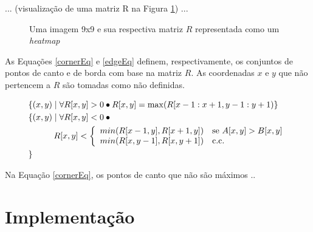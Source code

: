 \documentclass[12pt]{article}
\begin{document}
... (visualização de uma matriz R na Figura \ref{figR}) ...

\begin{figure}[h]
  \centering
  \quad
  \caption{Uma imagem 9x9 e sua respectiva matriz $R$ representada
    como um \textit{heatmap}\label{figR}}
\end{figure}


As Equações \ref{cornerEq} e \ref{edgeEq} definem, respectivamente, os
conjuntos de pontos de canto e de borda com base na matriz $R$. As
coordenadas $x$ e $y$ que não pertencem a $R$ são tomadas como não
definidas.

\begin{align}
  &\{(x, y) \mid \forall R[x,y] > 0 \bullet R[x,y] = \max(R[x-1:x+1,y-1:y+1)\} \label{cornerEq} \\
  &\{
    (x, y) \mid \forall R[x,y] < 0 \bullet \mbox{} \nonumber \\
  & \quad\quad\quad R[x,y] < \left\{
      \begin{array}{l l}
        min(R[x-1,y], R[x+1,y]) & \mbox{se} \,\, A[x,y] > B[x,y]\\
        min(R[x,y-1], R[x,y+1]) & \mbox{c.c.}\\
      \end{array}
    \right. \\ \label{edgeEq}
  &\} \nonumber
\end{align}

Na Equação \ref{cornerEq}, os pontos de canto que não são máximos ..

\section{Implementação}
\end{document}
